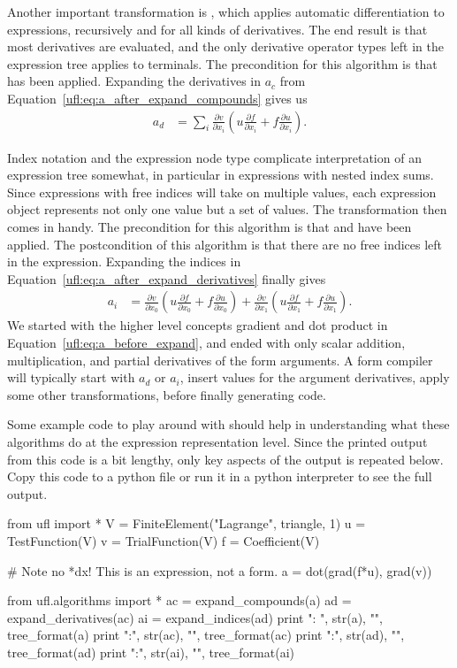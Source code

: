 Another important transformation is , which
applies automatic differentiation to expressions, recursively and for
all kinds of derivatives.  The end result is that most derivatives are
evaluated, and the only derivative operator types left in the expression
tree applies to terminals. The precondition for this algorithm is that
 has been applied.  Expanding the derivatives in
$a_c$ from Equation~\eqref{ufl:eq:a_after_expand_compounds} gives us
\begin{align} \label{ufl:eq:a_after_expand_derivatives}
a_d &= \sum_{i} \frac{\partial v}{\partial x_i} (u \frac{\partial f}{\partial x_i} + f \frac{\partial u}{\partial x_i}).
\end{align}

Index notation and the  expression node type complicate
interpretation of an expression tree somewhat, in particular
in expressions with nested index sums.  Since expressions with
free indices will take on multiple values, each expression object
represents not only one value but a set of values.  The transformation
 then comes in handy.  The precondition for this
algorithm is that  and 
have been applied. The postcondition of this algorithm is that there
are no free indices left in the expression. Expanding the indices in
Equation~\eqref{ufl:eq:a_after_expand_derivatives} finally gives
\begin{align} \label{ufl:eq:a_after_expand_indices}
  a_i &= \frac{\partial v}{\partial x_0} (u \frac{\partial f}{\partial x_0}
      + f \frac{\partial u}{\partial x_0})
      + \frac{\partial v}{\partial x_1} (u \frac{\partial f}{\partial x_1}
      + f \frac{\partial u}{\partial x_1}).
\end{align}
We started with the higher level concepts gradient and dot product
in Equation~\eqref{ufl:eq:a_before_expand}, and ended with only scalar
addition, multiplication, and partial derivatives of the form arguments. A
form compiler will typically start with $a_d$ or $a_i$, insert values
for the argument derivatives, apply some other transformations, before
finally generating code.

Some example code to play around with should help in understanding what
these algorithms do at the expression representation level.  Since the
printed output from this code is a bit lengthy, only key aspects of the
output is repeated below. Copy this code to a python file or run it in
a python interpreter to see the full output.
\begin{python}
from ufl import *
V = FiniteElement("Lagrange", triangle, 1)
u = TestFunction(V)
v = TrialFunction(V)
f = Coefficient(V)

# Note no *dx! This is an expression, not a form.
a = dot(grad(f*u), grad(v))

from ufl.algorithms import *
ac = expand_compounds(a)
ad = expand_derivatives(ac)
ai = expand_indices(ad)
print "\na: ", str(a),  "\n", tree_format(a)
print "\nac:", str(ac), "\n", tree_format(ac)
print "\nad:", str(ad), "\n", tree_format(ad)
print "\nai:", str(ai), "\n", tree_format(ai)
\end{python}

